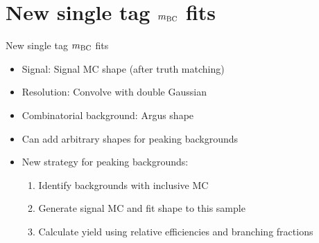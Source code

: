 \documentclass{beamer}
\begin{document}
\section{New single tag \texorpdfstring{$m_{\rm BC}$}{MBC} fits}
\begin{frame}{New single tag $m_{\rm BC}$ fits}
  \begin{itemize}
    \setlength\itemsep{2em}
    \item{Signal: Signal MC shape (after truth matching)}
    \item{Resolution: Convolve with double Gaussian}
    \item{Combinatorial background: Argus shape}
    \item{Can add arbitrary shapes for peaking backgrounds}
    \item{New strategy for peaking backgrounds:}
    \begin{enumerate}
      \item{Identify backgrounds with inclusive MC}
      \item{Generate signal MC and fit shape to this sample}
      \item{Calculate yield using relative efficiencies and branching fractions}
    \end{enumerate}
  \end{itemize}
\end{frame}
\end{document}
